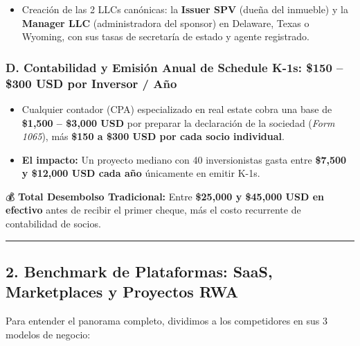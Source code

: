 \documentclass[
]{article}
\providecommand{\tightlist}{%
  \setlength{\itemsep}{0pt}\setlength{\parskip}{0pt}}
\renewenvironment{quote}{%
  \vspace{0.4em}
  \begin{tcolorbox}[
    colback=bridsLight,
    colframe=bridsBlue,
    arc=2mm,
    boxrule=1.2pt,
    left=10pt,
    right=10pt,
    top=8pt,
    bottom=8pt,
    before skip=6pt,
    after skip=8pt
  ]%
}{%
  \end{tcolorbox}%
}
\begin{document}
\begin{itemize}
\tightlist
\item
  Creación de las 2 LLCs canónicas: la \textbf{Issuer SPV} (dueña del
  inmueble) y la \textbf{Manager LLC} (administradora del sponsor) en
  Delaware, Texas o Wyoming, con sus tasas de secretaría de estado y
  agente registrado.
\end{itemize}

\subsubsection{D. Contabilidad y Emisión Anual de Schedule K-1s: \$150
-- \$300 USD por Inversor /
Año}\label{d.-contabilidad-y-emisiuxf3n-anual-de-schedule-k-1s-150-300-usd-por-inversor-auxf1o}

\begin{itemize}
\tightlist
\item
  Cualquier contador (CPA) especializado en real estate cobra una base
  de \textbf{\$1,500 -- \$3,000 USD} por preparar la declaración de la
  sociedad (\emph{Form 1065}), más \textbf{\$150 a \$300 USD por cada
  socio individual}.
\item
  \textbf{El impacto:} Un proyecto mediano con 40 inversionistas gasta
  entre \textbf{\$7,500 y \$12,000 USD cada año} únicamente en emitir
  K-1s.
\end{itemize}

\begin{quote}
💰 \textbf{Total Desembolso Tradicional:} Entre \textbf{\$25,000 y
\$45,000 USD en efectivo} antes de recibir el primer cheque, más el
costo recurrente de contabilidad de socios.
\end{quote}

\begin{center}\rule{0.5\linewidth}{0.5pt}\end{center}

\subsection{2. Benchmark de Plataformas: SaaS, Marketplaces y Proyectos
RWA}\label{benchmark-de-plataformas-saas-marketplaces-y-proyectos-rwa}

Para entender el panorama completo, dividimos a los competidores en sus
3 modelos de negocio:
\end{document}
